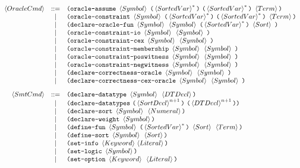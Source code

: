 \documentclass[english,a4paper,10pt]{article}
\begin{document}
\[
\begin{array}{rcl}  
 \oraclecmd 
 & ::= & \paren{\assumeoraclekwd\mbox{ }\symbol\mbox{ } \paren{\kstar{\sortedvar}}\mbox{ }\paren{\kstar{\sortedvar}}\mbox{ }
  \term} \\
  & | & \paren{\constraintoraclekwd\mbox{ }\symbol\mbox{ } \paren{\kstar{\sortedvar}}\mbox{ }\paren{\kstar{\sortedvar}}\mbox{ }
  \term} \\
 & | & \paren{\oracledeckwd\mbox{ }\symbol\mbox{ }\symbol\mbox{ }\paren{\kstar{\sortedvar}}\mbox{ }\sortexpr\mbox{ }} \\
 & | &\paren{\iooracledeckwd\mbox{ }\symbol\mbox{ } \symbol\mbox{ }} \\
 & | &\paren{\cexoracledeckwd\mbox{ }\symbol\mbox{ } \symbol\mbox{ }} \\
 & | &\paren{\memoracledeckwd\mbox{ }\symbol\mbox{ } \symbol\mbox{ }} \\
 & | &\paren{\poswitnessoracledeckwd\mbox{ }\symbol\mbox{ } \symbol\mbox{ }} \\
 & | &\paren{\negwitnessoracledeckwd\mbox{ }\symbol\mbox{ } \symbol\mbox{ }} \\
 & | &\paren{\corroracledeckwd\mbox{ }\symbol\mbox{ } \symbol\mbox{ }} \\
 & | &\paren{\corrcexoracledeckwd\mbox{ }\symbol\mbox{ } \symbol\mbox{ }} \\[2ex]

 \smtcmd 
 & ::= &\paren{\dtdeclkwd\mbox{ }\symbol\mbox{ }\dtdecl} \\
 & | & \paren{\dtsdeclkwd\mbox{ }\paren{\kstarn{\sortdecl}{n+1} }\mbox{ }\paren{\kstarn{\dtdecl}{n+1}}} \\
 & | & \paren{\sortdeclkwd\mbox{ }\symbol\mbox{ }\intconst} \\
 & | & \paren{\weightdeclkwd\mbox{ }\symbol} \\
 & | & \paren{\fundefkwd\mbox{ }\symbol\mbox{ }\paren{\kstar{\sortedvar}}\mbox{ }\sortexpr\mbox{ }\term} \\  %
 & | & \paren{\sortdefkwd\mbox{ }\symbol\mbox{ }\sortexpr} \\
 & | & \paren{\setinfokwd\mbox{ }\keyword{ }\literal} \\
 & | & \paren{\setlogickwd\mbox{ }\symbol} \\
 & | & \paren{\setoptkwd\mbox{ }\keyword\mbox{ }\literal}\\[2ex]



\end{array}\]
\end{document}
